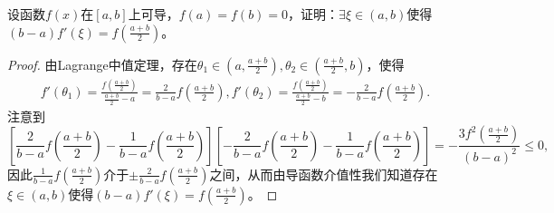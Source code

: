 \documentclass[../../main.tex]{subfiles}%
\begin{document}
\begin{example}
设函数$f(x)$在$[a,b]$上可导，$f(a)=f(b)=0$，证明：$\exists \xi \in (a,b)$使得$(b - a)f'(\xi)=f\left(\frac{a + b}{2}\right)$。
\end{example}
\begin{proof}
由Lagrange中值定理，存在$ \theta_1 \in \left( a,\frac{a+b}{2} \right) ,\theta_2 \in \left( \frac{a+b}{2},b \right) $，使得
\begin{align*}
f'(\theta_1)=\frac{f\left( \frac{a+b}{2} \right)}{\frac{a+b}{2}-a}=\frac{2}{b-a}f\left( \frac{a+b}{2} \right) , f'(\theta_2)=\frac{f\left( \frac{a+b}{2} \right)}{\frac{a+b}{2}-b}=-\frac{2}{b-a}f\left( \frac{a+b}{2} \right) .
\end{align*}
注意到
$$\left[\frac{2}{b - a}f\left(\frac{a + b}{2}\right)-\frac{1}{b - a}f\left(\frac{a + b}{2}\right)\right]\left[-\frac{2}{b - a}f\left(\frac{a + b}{2}\right)-\frac{1}{b - a}f\left(\frac{a + b}{2}\right)\right]=-\frac{3f^2\left(\frac{a + b}{2}\right)}{(b - a)^2}\leqslant 0,$$
因此$\frac{1}{b - a}f\left(\frac{a + b}{2}\right)$介于$\pm \frac{2}{b - a}f\left(\frac{a + b}{2}\right)$之间，从而由导函数介值性我们知道存在$\xi \in (a,b)$使得$(b - a)f'(\xi)=f\left(\frac{a + b}{2}\right)$。
\end{proof}
\end{document}

